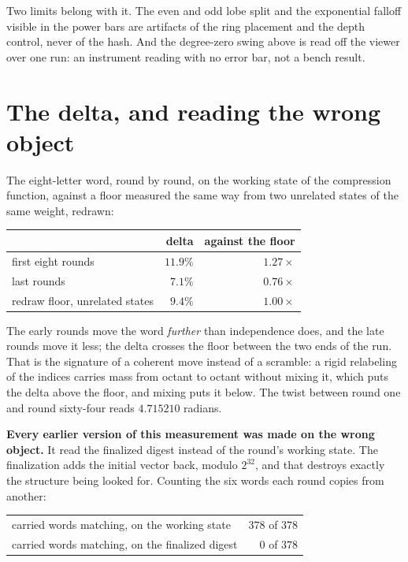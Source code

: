 Two limits belong with it. The even and odd lobe split and the exponential falloff visible in the power bars are artifacts of the ring placement and the depth control, never of the hash. And the degree-zero swing above is read off the viewer over one run: an instrument reading with no error bar, not a bench result.

\section{The delta, and reading the wrong object}

The eight-letter word, round by round, on the working state of the compression function, against a floor measured the same way from two unrelated states of the same weight, redrawn:

\begin{center}
\begin{tabular}{lrr}
\toprule
 & delta & against the floor \\
\midrule
first eight rounds & \(11.9\%\) & \(1.27\times\) \\
last rounds & \(7.1\%\) & \(0.76\times\) \\
redraw floor, unrelated states & \(9.4\%\) & \(1.00\times\) \\
\bottomrule
\end{tabular}
\end{center}

The early rounds move the word \emph{further} than independence does, and the late rounds move it less; the delta crosses the floor between the two ends of the run. That is the signature of a coherent move instead of a scramble: a rigid relabeling of the indices carries mass from octant to octant without mixing it, which puts the delta above the floor, and mixing puts it below. The twist between round one and round sixty-four reads \(4.715210\) radians.

\textbf{Every earlier version of this measurement was made on the wrong object.} It read the finalized digest instead of the round's working state. The finalization adds the initial vector back, modulo \(2^{32}\), and that destroys exactly the structure being looked for. Counting the six words each round copies from another:

\begin{center}
\begin{tabular}{lr}
\toprule
carried words matching, on the working state & \(378\) of \(378\) \\
carried words matching, on the finalized digest & \(0\) of \(378\) \\
\bottomrule
\end{tabular}
\end{center}

